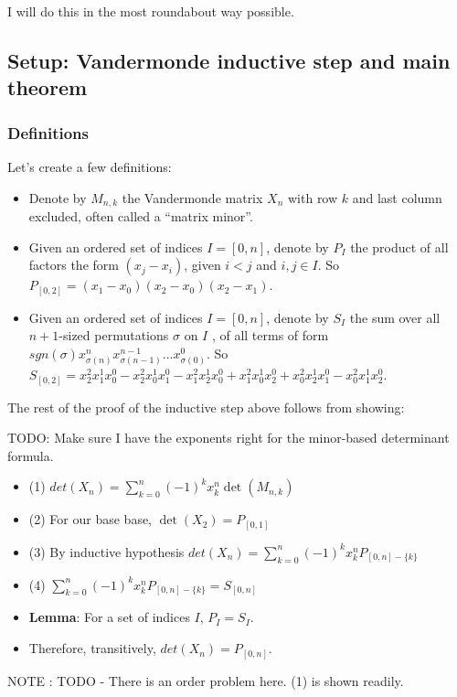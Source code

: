 \documentclass[11pt, oneside]{article} 	%
\begin{document}
I will do this in the most roundabout way possible. 

\subsection{Setup: Vandermonde inductive step and main theorem}
\subsubsection{Definitions} 

Let's create a few definitions: 
\begin{itemize}
\item Denote by $M_{n,k}$ the Vandermonde matrix  $X_n$ with row $k$ and last column excluded, often called a ``matrix minor''.
\item Given an ordered set of indices $I = [0, n]$, denote by $P_I$ the product of all factors the form $(x_j - x_i)$, given $i < j$ and $i, j \in I$.  So $P_{[0,2]} = (x_1 - x_0)(x_2-x_0)(x_2- x_1)$.
\item Given an ordered set of indices $I = [0, n]$, denote by $S_I$ the sum over all $n+1$-sized permutations $\sigma$ on $I$ , of all terms of form $sgn(\sigma) x_{\sigma(n)}^{n} x_{\sigma(n-1)}^{n-1} ... x_{\sigma(0)}^{0} $. So $S_{[0,2]} = x_2^2x_1^1x_0^0 - x_2^2x_0^1x_1^0 - x_1^2x_2^1x_0^0 + x_1^2x_0^1x_2^0 + x_0^2x_2^1x_1^0 - x_0^2x_1^1x_2^0$.
\end{itemize}

The rest of the proof of the inductive step above follows from showing:

TODO: Make sure I have the exponents right for the minor-based determinant formula.

\begin{itemize}
\item (1) $det(X_n) = \sum_{k=0}^n (-1)^k x_k^n\det(M_{n, k})$ 
\item (2) For our base base, $\det(X_2) = P_{[0,1]}$
\item (3) By inductive hypothesis $det(X_n) = \sum_{k=0}^n (-1)^k x_k^n P_{[0,n] - \{k\}}$
\item (4) $\sum_{k=0}^n (-1)^k x_k^n P_{[0,n] -\{k\}} = S_[0, n]$
\item \textbf{Lemma}: For a set of indices $I$, $P_I = S_I$.  
\item Therefore, transitively, $det(X_n) = P_{[0, n]}$.
\end{itemize}

NOTE : TODO -  There is an order problem here.
(1) is shown readily.  
\end{document}

